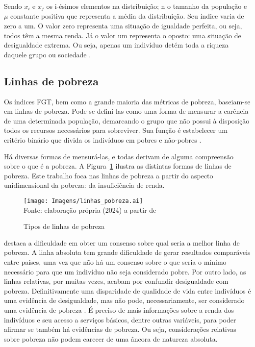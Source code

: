Sendo $x_i$ e $x_j$ os i-ésimos elementos na distribuição; n o tamanho da população e $\mu$ constante positiva que representa a média da distribuição. Seu índice varia de zero a um. O valor zero representa uma situação de igualdade perfeita, ou seja, todos têm a mesma renda. Já o valor um representa o oposto: uma situação de desigualdade extrema. Ou seja, apenas um indivíduo detém toda a riqueza daquele grupo ou sociedade \cite{hoffmann19}.


\subsection{Linhas de pobreza}

Os índices FGT, bem como a grande maioria das métricas de pobreza, baseiam-se em linhas de pobreza. Pode-se defini-las como uma forma de mensurar a carência de uma determinada população, demarcando o grupo que não possui à disposição todos os recursos necessários para sobreviver. Sua função é estabelecer um critério binário que divida os indivíduos em pobres e não-pobres \cite{soares09}.

Há diversas formas de mensurá-las, e todas derivam de alguma compreensão sobre o que é a pobreza. A Figura~\ref{fig:linhas_pobreza} ilustra as distintas formas de linhas de pobreza. Este trabalho foca nas linhas de pobreza a partir do aspecto unidimensional da pobreza: da insuficiência de renda.

\begin{figure}[h]
	\centering
	\caption{Tipos de linhas de pobreza}
	\texttt{[image: Imagens/linhas\_pobreza.ai]} \\
	\label{fig:linhas_pobreza}
	\footnotesize
	Fonte: elaboração própria (2024) a partir de \textcite{soares09}
\end{figure}

\textcite{soares09} destaca a dificuldade em obter um consenso sobre qual seria a melhor linha de pobreza. A linha absoluta tem grande dificuldade de gerar resultados comparáveis entre países, uma vez que não há um consenso sobre o que seria o mínimo necessário para que um indivíduo não seja considerado pobre. Por outro lado, as linhas relativas, por muitas vezes, acabam por confundir desigualdade com pobreza. Definitivamente uma disparidade de qualidade de vida entre indivíduos é uma evidência de desigualdade, mas não pode, necessariamente, ser considerado uma evidência de pobreza \cite{sen83}. É preciso de mais informações sobre a renda dos indivíduos e seu acesso a serviços básicos, dentre outras variáveis, para poder afirmar se também há evidências de pobreza. Ou seja, considerações relativas sobre pobreza não podem carecer de uma âncora de natureza absoluta.

